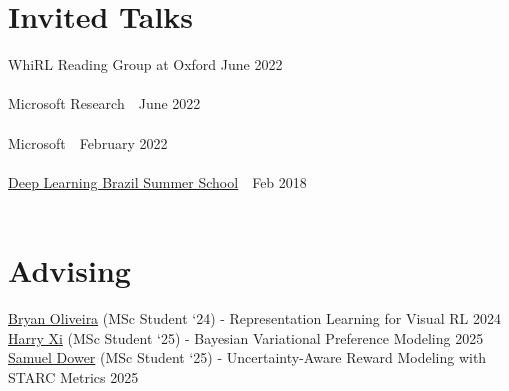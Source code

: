 \documentclass[11pt,letter,sans,colorlinks,linkcolor=true]{moderncv}
\begin{document}
\section{Invited Talks}
      WhiRL Reading Group at Oxford
  \hfill June 2022 \\
   {\scriptsize
        \textit{\color{gray}{(Invited Talk) Transformers are Meta-Reinforcement Learners}}
      } \vspace{3mm}
 \\
      Microsoft Research
      \,\, {\scriptsize
      }
  \hfill June 2022 \\
   {\scriptsize
        \textit{\color{gray}{(Reading Group) Transformers are Meta-Reinforcement Learners}}
      } \vspace{3mm}
 \\
      Microsoft
      \,\, {\scriptsize
      }
  \hfill February 2022 \\
   {\scriptsize
        \textit{\color{gray}{(Invited Talk) PulseRL: Enabling Offline Reinforcement Learning for Digital Marketing Systems via Conservative Q-Learning}}
      } \vspace{3mm}
 \\
      \href{https://youtu.be/Ycggd_Bg6nY}{Deep Learning Brazil Summer School}
      \,\, {\scriptsize
        \color{gray}{}
      }
  \hfill Feb 2018 \\
   {\scriptsize
        \textit{\color{gray}{Introduction to Deep Reinforcement Learning}}
      } \vspace{3mm}
 \\


\section{Advising}
      \href{https://bryanoliveira.github.io/}{Bryan Oliveira} (MSc Student `24) - Representation Learning for Visual RL
    \hfill 2024 \\
      \href{https://harryzxi.github.io/}{Harry Xi} (MSc Student `25) - Bayesian Variational Preference Modeling
    \hfill 2025 \\
      \href{https://www.linkedin.com/in/samuel-dower-128702234/}{Samuel Dower} (MSc Student `25) - Uncertainty-Aware Reward Modeling with STARC Metrics
    \hfill 2025 \\
\end{document}
